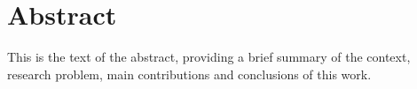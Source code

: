\chapter*{Abstract}

This is the text of the abstract, providing a brief summary of the context, research problem, main contributions and conclusions of this work.
